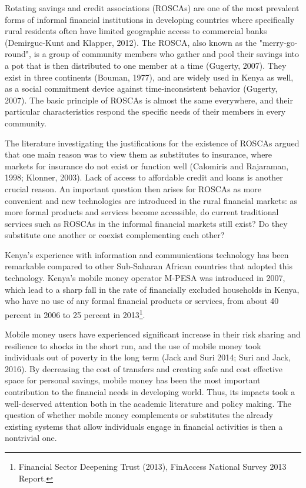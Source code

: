 \documentclass[11pt]{article}
\numberwithin{equation}{section}
\begin{document}
Rotating savings and credit associations (ROSCAs) are one of the most prevalent forms of informal financial institutions in developing countries where specifically rural residents often have limited geographic access to commercial banks (Demirguc-Kunt and Klapper, 2012). The ROSCA, also known as the "merry-go-round", is a group of community members who gather and pool their savings into a pot that is then distributed to one member at a time (Gugerty, 2007). They exist in three continents (Bouman, 1977), and are widely used in Kenya as well, as a social commitment device against time-inconsistent behavior (Gugerty, 2007). The basic principle of ROSCAs is almost the same everywhere, and their particular characteristics respond the specific needs of their members in every community.

The literature investigating the justifications for the existence of ROSCAs argued that one main reason was to view them as substitutes to insurance, where markets for insurance do not exist or function well (Calomiris and Rajaraman, 1998; Klonner, 2003). Lack of access to affordable credit and loans is another crucial reason. An important question then arises for ROSCAs as more convenient and new technologies are introduced in the rural financial markets: as more formal products and services become accessible, do current traditional services such as ROSCAs in the informal financial markets still exist? Do they substitute one another or coexist complementing each other? 

Kenya's experience with information and communications technology has been remarkable compared to other Sub-Saharan African countries that adopted this technology. Kenya's mobile money operator M-PESA was introduced in 2007, which lead to a sharp fall in the rate of financially excluded households in Kenya, who have no use of any formal financial products or services, from about 40 percent in 2006 to 25 percent in 2013\footnote{Financial Sector Deepening Trust (2013), FinAccess National Survey 2013 Report.}.

Mobile money users have experienced significant increase in their risk sharing and resilience to shocks in the short run, and the use of mobile money took individuals out of poverty in the long term (Jack and Suri 2014; Suri and Jack, 2016). By decreasing the cost of transfers and creating safe and cost effective space for personal savings, mobile money has been the most important contribution to the financial needs in developing world. Thus, its impacts took a well-deserved attention both in the academic literature and policy making. The question of whether mobile money complements or substitutes the already existing systems that allow individuals engage in financial activities is then a nontrivial one. 
\end{document}
